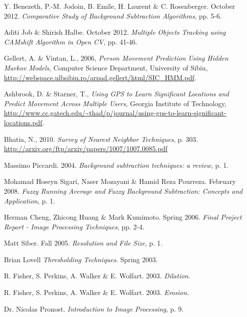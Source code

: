 \begin{thebibliography}{}

 Y. Benezeth, P.-M. Jodoin, B. Emile, H. Laurent \& C. Rosenberger. October 2012. \emph{Comparative Study of Background Subtraction Algorithms}, pp. 5-6.

 Aditi Job \& Shirish Halbe. October 2012. \emph{Multiple Objects Tracking using CAMshift Algorithm in Open CV}, pp. 41-46.

 Gellert, A. \& Vintan, L., 2006, \emph{Person Movement Prediction Using Hidden Markov Models}, Computer Science Department, University of Sibiu, \url{http://webspace.ulbsibiu.ro/arpad.gellert/html/SIC_HMM.pdf}.

 Ashbrook, D. \& Starner, T., \emph{Using GPS to Learn Significant Locations and Predict Movement Across Multiple Users}, Georgia Institute of Technology, \url{http://www.cc.gatech.edu/~thad/p/journal/using-gps-to-learn-significant-locations.pdf}.


 Bhatia, N., 2010. \emph{Survey of Nearest Neighbor Techniques}, p. 303. \url{http://arxiv.org/ftp/arxiv/papers/1007/1007.0085.pdf}


 Massimo Piccardi. 2004. \emph{Background subtraction techniques: a review}, p. 1.

 Mohamad Hoseyn Sigari, Naser Mozayani \& Hamid Reza Pourreza. February 2008. \emph{Fuzzy Running Average and Fuzzy Background Subtraction: Concepts and Application}, p. 1.

 Herman Cheng, Zhicong Huang \& Mark Kumimoto. Spring 2006. \emph{Final Project Report - Image Processing Techniques}, pp. 2-4.

 Matt Siber. Fall 2005. \emph{Resolution and File Size}, p. 1.

 Brian Lovell \emph{Thresholding Techniques}. Spring 2003.

 R. Fisher, S. Perkins, A. Walker \& E. Wolfart. 2003. \emph{Dilation}.

 R. Fisher, S. Perkins, A. Walker \& E. Wolfart. 2003. \emph{Erosion}.

 Dr. Nicolas Pronost. \emph{Introduction to Image Processing}, p. 9.


\end{thebibliography}
